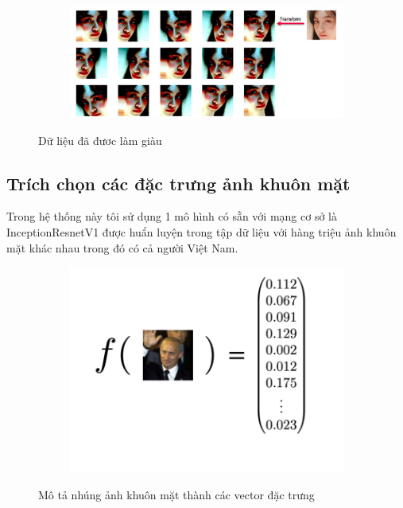 \begin{figure}
    \begin{subfigure}{0.9\textwidth}
        \includegraphics[width=1\linewidth]{Chapters/items/chap3_4.jpg}
        \label{fig:chap3_4}
    \end{subfigure}
    \caption{Dữ liệu đã đươc làm giàu}
\end{figure}


\newpage
\subsection{Trích chọn các đặc trưng ảnh khuôn mặt}
Trong hệ thống này tôi sử dụng 1 mô hình có sẵn với mạng cơ sở là InceptionResnetV1 được
huẩn luyện trong tập dữ liệu với hàng triệu ảnh khuôn mặt khác nhau trong đó có cả người Việt Nam.

\begin{figure}
    \begin{subfigure}{0.4\textwidth}
        \includegraphics[width=1\linewidth]{Chapters/items/embed.png}
        \label{fig:embed}
    \end{subfigure}
    \caption{Mô tả nhúng ảnh khuôn mặt thành các vector đặc trưng}
\end{figure}

